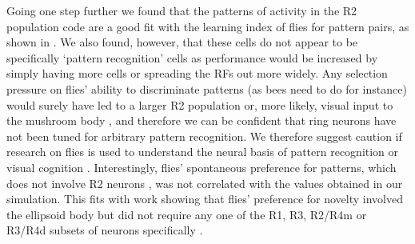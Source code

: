 Going one step further we found that the patterns of activity in the R2 population code are a good fit with the learning index of flies for pattern pairs, as shown in \cite{Ernst1999}. We also found, however, that these cells do not appear to be specifically ‘pattern recognition’ cells as performance would be increased by simply having more cells or spreading the RFs out more widely. Any selection pressure on flies’ ability to discriminate patterns (as bees need to do for instance) would surely have led to a larger R2 population or, more likely, visual input to the mushroom body \cite{Ehmer2002,Wolf1998}, and therefore we can be confident that ring neurons have not been tuned for arbitrary pattern recognition. We therefore suggest caution if research on flies is used to understand the neural basis of pattern recognition or visual cognition \cite{Menzel2001}. Interestingly, flies’ spontaneous preference for patterns, which does not involve R2 neurons \cite{Ernst1999}, was not correlated with the values obtained in our simulation. This fits with work showing that flies’ preference for novelty involved the ellipsoid body but did not require any one of the R1, R3, R2/R4m or R3/R4d subsets of neurons specifically \cite{Solanki2015}.

\begin{comment}
There is also the question of whether learning to discriminate arbitrary visual patterns is an ecologically relevant task for flies.
Certainly a general ability to perform associative learning is useful, but for many tasks, such as discriminating a conspecific from a predator, parsimonious, task-specific strategies are sufficient \cite{Layne1997}.
[Differences in fly vs bee neuroanatomy and eyes?]
This is in contrast to bees, which have a well-attested ability to discriminate visual stimuli and need to be able to discriminate arbitrary patterns in order to distinguish flowers.
Their anatomy too seems more suited to this task: they have many more facets [true?] and much larger optic lobes [this is probably true]. [...]
Just because an organism is able to perform a task does not mean that the organism has a `module' for this task.
For example, human beings are able to read despite there not having been selection pressure for this ability.
Like reading, it might also be a by-product of other evolved systems.
What is more interesting is how this information could be used by the organism in the service of behaviour; for example, these ring neuron visual filters can be used by an agent to localise within an arena \cite{Dewar2015}, mimicking real fly behaviour \cite{Ofstad2011}.
\end{comment}

